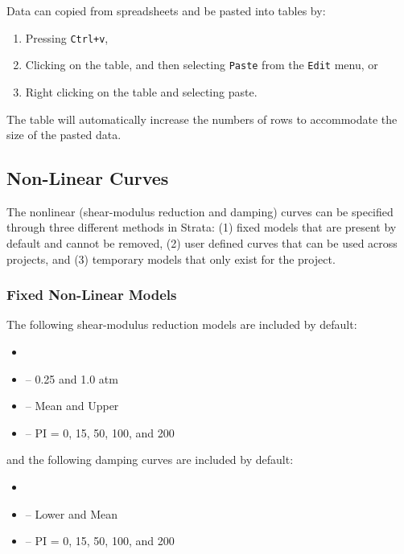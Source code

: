 \documentclass[11pt]{report}
\begin{document}
Data can copied from spreadsheets and be pasted into tables by:
\begin{enumerate}
  \item Pressing \texttt{Ctrl+v}, 
  \item Clicking on the table, and then selecting \texttt{Paste} from the \texttt{Edit} menu, or
  \item Right clicking on the table and selecting paste.
\end{enumerate}
The table will automatically increase the numbers of rows to accommodate the size of the pasted
data.

\subsection{Non-Linear Curves}
The nonlinear (shear-modulus reduction and damping) curves can be specified through three
different methods in Strata: (1) fixed models that are present by default and cannot be removed, (2)
user defined curves that can be used across projects, and (3) temporary models that only exist for
the project.

\subsubsection{Fixed Non-Linear Models}

The following shear-modulus reduction models are included by default:
\begin{itemize}
  \item \citet{darendeli:01}
  \item \citet{iwasaki:76} -- 0.25 and 1.0 atm
  \item \citet{seed:70} -- Mean and Upper
  \item \citet{vucetic:91} -- PI = 0, 15, 50, 100, and 200
\end{itemize}
and the following damping curves are included by default:
\begin{itemize}
  \item \citet{darendeli:01}
  \item \citet{seed:70} -- Lower and Mean
  \item \citet{vucetic:91} -- PI = 0, 15, 50, 100, and 200
\end{itemize}
\end{document}
